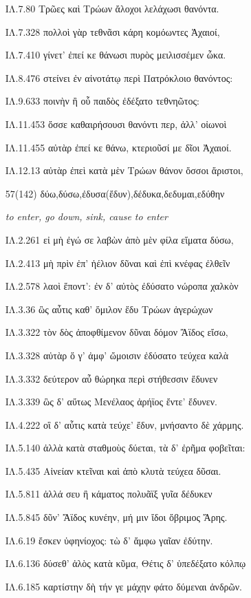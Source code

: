 \begin{enumerate}
{ΙΛ.7.80 Τρῶες καὶ Τρώων ἄλοχοι λελάχωσι θανόντα. 

ΙΛ.7.328 πολλοὶ γὰρ τεθνᾶσι κάρη κομόωντες Ἀχαιοί, 

ΙΛ.7.410 γίνετ' ἐπεί κε θάνωσι πυρὸς μειλισσέμεν ὦκα. 

ΙΛ.8.476 στείνει ἐν αἰνοτάτῳ περὶ Πατρόκλοιο θανόντος: 

ΙΛ.9.633 ποινὴν ἢ οὗ παιδὸς ἐδέξατο τεθνηῶτος: 

ΙΛ.11.453 ὄσσε καθαιρήσουσι θανόντι περ, ἀλλ' οἰωνοὶ 

ΙΛ.11.455 αὐτὰρ ἐπεί κε θάνω, κτεριοῦσί με δῖοι Ἀχαιοί. 

ΙΛ.12.13 αὐτὰρ ἐπεὶ κατὰ μὲν Τρώων θάνον ὅσσοι ἄριστοι, 

}

\clearpage
\item[\large 57(142)]{\large \g δύω,δύσω,ἐδυσα(ἔδυν),δέδυκα,δεδυμαι,εδύθην	}

\hspace{0.2cm} \textit{ to enter, go down, sink, cause to enter }

{\g
ΙΛ.2.261 εἰ μὴ ἐγώ σε λαβὼν ἀπὸ μὲν φίλα εἵματα δύσω, 

ΙΛ.2.413 μὴ πρὶν ἐπ' ἠέλιον δῦναι καὶ ἐπὶ κνέφας ἐλθεῖν 

ΙΛ.2.578 λαοὶ ἕποντ': ἐν δ' αὐτὸς ἐδύσατο νώροπα χαλκὸν 

ΙΛ.3.36 ὣς αὖτις καθ' ὅμιλον ἔδυ Τρώων ἀγερώχων 

ΙΛ.3.322 τὸν δὸς ἀποφθίμενον δῦναι δόμον Ἄϊδος εἴσω, 

ΙΛ.3.328 αὐτὰρ ὅ γ' ἀμφ' ὤμοισιν ἐδύσατο τεύχεα καλὰ 

ΙΛ.3.332 δεύτερον αὖ θώρηκα περὶ στήθεσσιν ἔδυνεν 

ΙΛ.3.339 ὣς δ' αὔτως Μενέλαος ἀρήϊος ἔντε' ἔδυνεν. 

ΙΛ.4.222 οἳ δ' αὖτις κατὰ τεύχε' ἔδυν, μνήσαντο δὲ χάρμης. 

ΙΛ.5.140 ἀλλὰ κατὰ σταθμοὺς δύεται, τὰ δ' ἐρῆμα φοβεῖται: 

ΙΛ.5.435 Αἰνείαν κτεῖναι καὶ ἀπὸ κλυτὰ τεύχεα δῦσαι. 

ΙΛ.5.811 ἀλλά σευ ἢ κάματος πολυᾶϊξ γυῖα δέδυκεν 

ΙΛ.5.845 δῦν' Ἄϊδος κυνέην, μή μιν ἴδοι ὄβριμος Ἄρης. 

ΙΛ.6.19 ἔσκεν ὑφηνίοχος: τὼ δ' ἄμφω γαῖαν ἐδύτην. 

ΙΛ.6.136 δύσεθ' ἁλὸς κατὰ κῦμα, Θέτις δ' ὑπεδέξατο κόλπῳ 

ΙΛ.6.185 καρτίστην δὴ τήν γε μάχην φάτο δύμεναι ἀνδρῶν. 

}
\end{enumerate}
